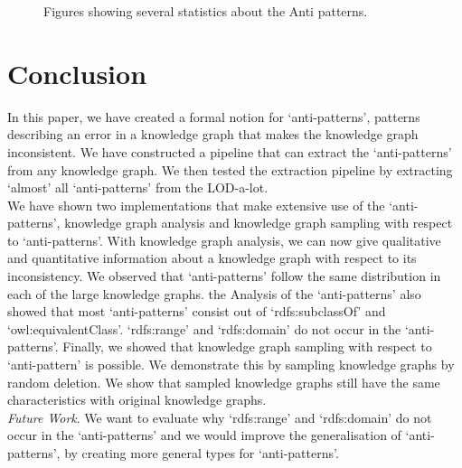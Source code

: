 \documentclass{article}
\begin{document}
\begin{figure}[ht]
{	}
	\caption{Figures showing several statistics about the Anti patterns.}
	\label{fig:Antipattern}
\end{figure}

\newpage


\section{Conclusion}


In this paper, we have created a formal notion for `anti-patterns', patterns describing an error in a knowledge graph that makes the knowledge graph inconsistent. 
We have constructed a pipeline that can extract the `anti-patterns' from any knowledge graph. We then tested the extraction pipeline by extracting `almost' all `anti-patterns' from the LOD-a-lot. \\
We have shown two implementations that make extensive use of the `anti-patterns', knowledge graph analysis and knowledge graph sampling with respect to `anti-patterns'.
With knowledge graph analysis, we can now give qualitative and quantitative information about a knowledge graph with respect to its inconsistency. 
We observed that `anti-patterns' follow the same distribution in each of the large knowledge graphs. the Analysis of the `anti-patterns' also showed that most `anti-patterns' consist out of `rdfs:subclassOf' and `owl:equivalentClass'. `rdfs:range' and `rdfs:domain' do not occur in the `anti-patterns'.
Finally, we showed that knowledge graph sampling with respect to `anti-pattern' is possible. We demonstrate this by sampling knowledge graphs by random deletion.
We show that sampled knowledge graphs still have the same characteristics with original knowledge graphs.\\
\textit{Future Work}. We want to evaluate why `rdfs:range' and `rdfs:domain' do not occur in the `anti-patterns' and we would improve the generalisation of `anti-patterns', by creating more general types for `anti-patterns'. 
\end{document}
